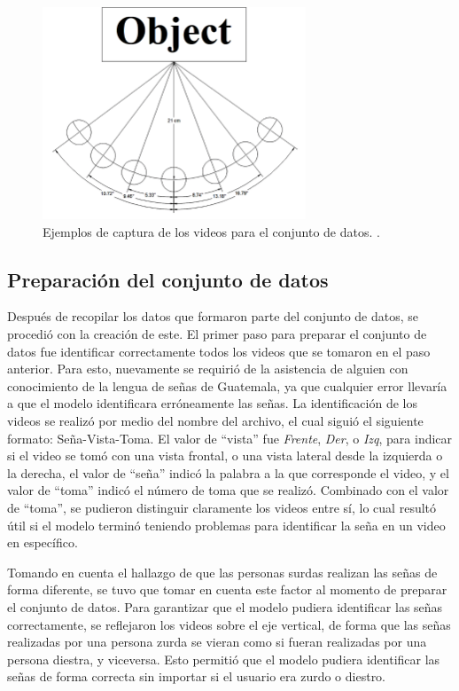 \begin{figure}[H]
    \centering
    \includegraphics[width=0.7\textwidth]{figuras/Angles.png}
    \caption{Ejemplos de captura de los videos para el conjunto de datos. \cite{kucsvan2019}.}
    \label{fig:angulos}
\end{figure}


\subsection{Preparación del conjunto de datos}
Después de recopilar los datos que formaron parte del conjunto de datos, se procedió con la creación de este.  
El primer paso para preparar el conjunto de datos fue identificar correctamente todos los videos que se tomaron en el paso anterior.  
Para esto, nuevamente se requirió de la asistencia de alguien con conocimiento de la lengua de señas de Guatemala, ya que cualquier error llevaría a que el modelo identificara erróneamente las señas.  
La identificación de los videos se realizó por medio del nombre del archivo, el cual siguió el siguiente formato: {Seña}-{Vista}-{Toma}.  
El valor de “vista” fue \textit{Frente}, \textit{Der}, o \textit{Izq}, para indicar si el video se tomó con una vista frontal, o una vista lateral desde la izquierda o la derecha, el valor de “seña” indicó la palabra a la que corresponde el video, y el valor de “toma” indicó el número de toma que se realizó. 
Combinado con el valor de “toma”, se pudieron distinguir claramente los videos entre sí, lo cual resultó útil si el modelo terminó teniendo problemas para identificar la seña en un video en específico.  

Tomando en cuenta el hallazgo de que las personas surdas realizan las señas de forma diferente, se tuvo que tomar en cuenta este factor al momento de preparar el conjunto de datos.
Para garantizar que el modelo pudiera identificar las señas correctamente, se reflejaron los videos sobre el eje vertical, de forma que las señas realizadas por una persona zurda se vieran como si fueran realizadas por una persona diestra, y viceversa.
Esto permitió que el modelo pudiera identificar las señas de forma correcta sin importar si el usuario era zurdo o diestro.

